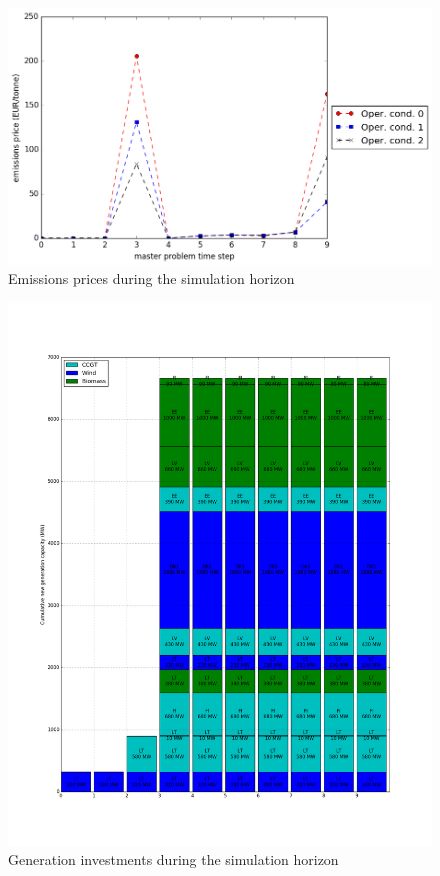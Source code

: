 \documentclass[final]{IEEEtran}
\begin{document}
\begin{figure}[htpb]
  \centering
  \includegraphics[width=\linewidth]{emissions_prices_trajectory_milp_dc_miqp_dc.png}
  \caption{Emissions prices during the simulation horizon}
  \label{fig_emissions_prices_trajectory}
\end{figure}

\begin{figure}[htpb]
	\centering
	\includegraphics[width=\linewidth]{generation_investment_milp_dc_miqp_dc.png}
	\caption{Generation investments during the simulation horizon}
	\label{fig_generation_investment}
\end{figure}
\end{document}
